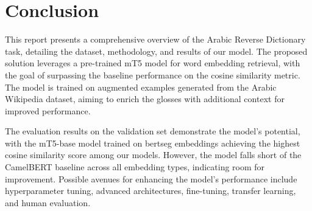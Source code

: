 \documentclass[15pt]{article}
\begin{document}
\newpage

\section*{Conclusion}

This report presents a comprehensive overview of the Arabic Reverse Dictionary task, detailing the dataset, methodology, and results of our model. The proposed solution leverages a pre-trained mT5 model for word embedding retrieval, with the goal of surpassing the baseline performance on the cosine similarity metric. The model is trained on augmented examples generated from the Arabic Wikipedia dataset, aiming to enrich the glosses with additional context for improved performance.

The evaluation results on the validation set demonstrate the model's potential, with the mT5-base model trained on bertseg embeddings achieving the highest cosine similarity score among our models. However, the model falls short of the CamelBERT baseline across all embedding types, indicating room for improvement. Possible avenues for enhancing the model's performance include hyperparameter tuning, advanced architectures, fine-tuning, transfer learning, and human evaluation.

\newpage

\printbibliography[title={References}]\label{lastpage}
\end{document}
